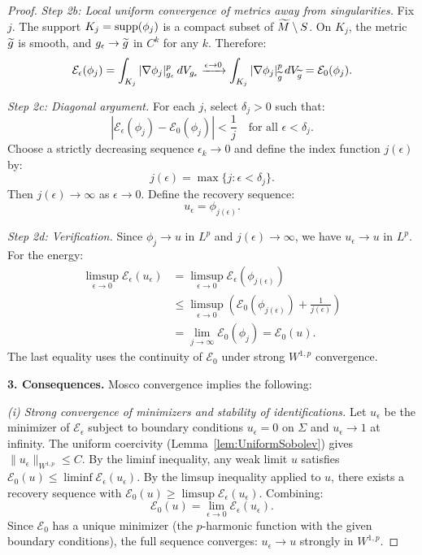 \begin{proof}
\textit{Step 2b: Local uniform convergence of metrics away from singularities.}
Fix $j$. The support $K_j = \mathrm{supp}(\phi_j)$ is a compact subset of $\widetilde{M} \setminus S$. On $K_j$, the metric $\widetilde{g}$ is smooth, and $g_\epsilon \to \widetilde{g}$ in $C^k$ for any $k$. Therefore:
\[
    \mathcal{E}_\epsilon(\phi_j) = \int_{K_j} |\nabla \phi_j|_{g_{\epsilon}}^p \, dV_{g_{\epsilon}} \xrightarrow{\epsilon \to 0} \int_{K_j} |\nabla \phi_j|_{\widetilde{g}}^p \, dV_{\widetilde{g}} = \mathcal{E}_0(\phi_j).
\]

\textit{Step 2c: Diagonal argument.}
For each $j$, select $\delta_j > 0$ such that:
\[
    |\mathcal{E}_\epsilon(\phi_j) - \mathcal{E}_0(\phi_j)| < \frac{1}{j} \quad \text{for all } \epsilon < \delta_j.
\]
Choose a strictly decreasing sequence $\epsilon_k \to 0$ and define the index function $j(\epsilon)$ by:
\[
    j(\epsilon) = \max\{j : \epsilon < \delta_j\}.
\]
Then $j(\epsilon) \to \infty$ as $\epsilon \to 0$. Define the recovery sequence:
\[
    u_\epsilon = \phi_{j(\epsilon)}.
\]

\textit{Step 2d: Verification.}
Since $\phi_j \to u$ in $L^p$ and $j(\epsilon) \to \infty$, we have $u_\epsilon \to u$ in $L^p$. For the energy:
\begin{align*}
    \limsup_{\epsilon \to 0} \mathcal{E}_\epsilon(u_\epsilon) &= \limsup_{\epsilon \to 0} \mathcal{E}_\epsilon(\phi_{j(\epsilon)}) \\
    &\le \limsup_{\epsilon \to 0} \left( \mathcal{E}_0(\phi_{j(\epsilon)}) + \frac{1}{j(\epsilon)} \right) \\
    &= \lim_{j \to \infty} \mathcal{E}_0(\phi_j) = \mathcal{E}_0(u).
\end{align*}
The last equality uses the continuity of $\mathcal{E}_0$ under strong $W^{1,p}$ convergence.

\textbf{3. Consequences.}
Mosco convergence implies the following:

\textit{(i) Strong convergence of minimizers and stability of identifications.}
Let $u_\epsilon$ be the minimizer of $\mathcal{E}_\epsilon$ subject to boundary conditions $u_\epsilon = 0$ on $\Sigma$ and $u_\epsilon \to 1$ at infinity. The uniform coercivity (Lemma~\ref{lem:UniformSobolev}) gives $\|u_\epsilon\|_{W^{1,p}} \le C$. By the liminf inequality, any weak limit $u$ satisfies $\mathcal{E}_0(u) \le \liminf \mathcal{E}_\epsilon(u_\epsilon)$. By the limsup inequality applied to $u$, there exists a recovery sequence with $\mathcal{E}_0(u) \ge \limsup \mathcal{E}_\epsilon(u_\epsilon)$. Combining:
\[
    \mathcal{E}_0(u) = \lim_{\epsilon \to 0} \mathcal{E}_\epsilon(u_\epsilon).
\]
Since $\mathcal{E}_0$ has a unique minimizer (the $p$-harmonic function with the given boundary conditions), the full sequence converges: $u_\epsilon \to u$ strongly in $W^{1,p}$.


\end{proof}
